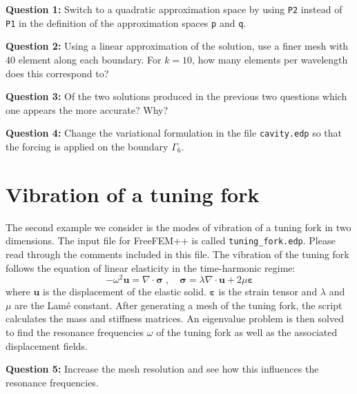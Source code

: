 \documentclass[english,3p]{elsarticle}
\newcommand{\code}[1]{\texttt{#1}}
\begin{document}
\textbf{Question 1:} Switch to a quadratic approximation space by using \code{P2} instead of \code{P1} in the definition of the approximation spaces \code{p} and \code{q}.

\textbf{Question 2:} Using a linear approximation of the solution, use a finer mesh with 40 element along each boundary.
For $k=10$, how many elements per wavelength does this correspond to?

\textbf{Question 3:} Of the two solutions produced in the previous two questions which one appears the more accurate? Why?

\textbf{Question 4:} Change the variational formulation in the file \code{cavity.edp} so that the forcing is applied on the boundary $\Gamma_6$.

\section{Vibration of a tuning fork}

The second example we consider is the modes of vibration of a tuning fork in two dimensions.
The input file for FreeFEM++ is called \code{tuning\_fork.edp}.
Please read through the comments included in this file.
The vibration of the tuning fork follows the equation of linear elasticity in the time-harmonic regime:
$$
-\omega^2\mathbf{u} = \nabla\cdot\boldsymbol{\sigma}
\;,\quad
\boldsymbol{\sigma} = \lambda\nabla\cdot\mathbf{u} + 2\mu\boldsymbol{\varepsilon}
$$
where $\mathbf{u}$ is the displacement of the elastic solid.
$\boldsymbol{\varepsilon}$ is the strain tensor and $\lambda$ and $\mu$ are the Lamé constant.
After generating a mesh of the tuning fork, the script calculates the mass and stiffness matrices.
An eigenvalue problem is then solved to find the resonance frequencies $\omega$ of the tuning fork as well as the associated displacement fields.

\textbf{Question 5:} Increase the mesh resolution and see how this influences the resonance frequencies.
\end{document}
